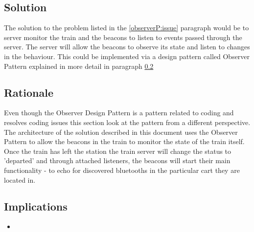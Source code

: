 \iffalse

	Therefore there is a clash of requirements which can be solved by implementing a version of a design pattern called the Observer Pattern configured to suit the needs to both be energy efficient and fault-proof. 

	This however creates an issue that the beacons should be allowed to operate on their own and they should also monitor the state of the train.
 \fi


\subsection{Solution} 
	The solution to the problem listed in the \ref{observerP:issue} paragraph would be to server monitor the train and the beacons to listen to events passed through the server. The server will allow the beacons to observe its state and listen to changes in the behaviour. This could be implemented via a design pattern called Observer Pattern explained in more detail in paragraph \ref{observerP:rationale}


\subsection{Rationale} \label{observerP:rationale}
	Even though the Observer Design Pattern is a pattern related to coding and resolves coding issues this section look at the pattern from a different perspective. The architecture of the solution described in this document uses the Observer Pattern to allow the beacons in the train to monitor the state of the train itself. Once the train has left the station the train server will change the status to 'departed' and through attached listeners, the beacons will start their main functionality - to echo for discovered bluetooths in the particular cart they are located in.

\subsection{Implications}
\begin{itemize}
  \item 
\end{itemize}

